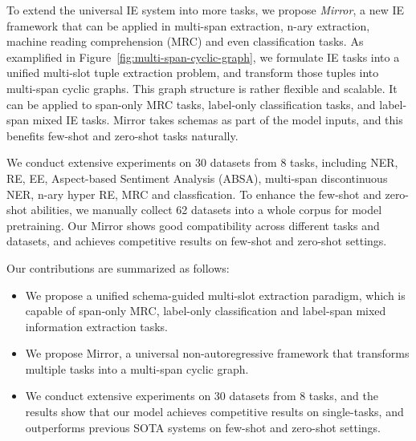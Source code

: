 To extend the universal IE system into more tasks, we propose \textit{Mirror}, a new IE framework that can be applied in multi-span extraction, n-ary extraction, machine reading comprehension (MRC) and even classification tasks.
As examplified in Figure~\ref{fig:multi-span-cyclic-graph}, we formulate IE tasks into a unified multi-slot tuple extraction problem, and transform those tuples into multi-span cyclic graphs.
This graph structure is rather flexible and scalable.
It can be applied to span-only MRC tasks, label-only classification tasks, and label-span mixed IE tasks.
Mirror takes schemas as part of the model inputs, and this benefits few-shot and zero-shot tasks naturally.

We conduct extensive experiments on 30 datasets from 8 tasks, including NER, RE, EE, Aspect-based Sentiment Analysis (ABSA), multi-span discontinuous NER, n-ary hyper RE, MRC and classfication.
To enhance the few-shot and zero-shot abilities, we manually collect 62 datasets into a whole corpus for model pretraining.
Our Mirror shows good compatibility across different tasks and datasets, and achieves competitive results on few-shot and zero-shot settings.

Our contributions are summarized as follows:
\begin{itemize}
    \item We propose a unified schema-guided multi-slot extraction paradigm, which is capable of span-only MRC, label-only classification and label-span mixed information extraction tasks.
    \item We propose Mirror, a universal non-autoregressive framework that transforms multiple tasks into a multi-span cyclic graph.
    \item We conduct extensive experiments on 30 datasets from 8 tasks, and the results show that our model achieves competitive results on single-tasks, and outperforms previous SOTA systems on few-shot and zero-shot settings.
\end{itemize}
